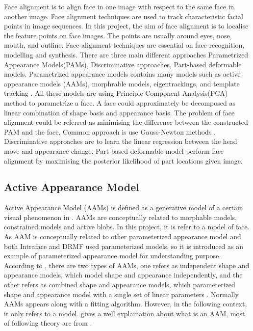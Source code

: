 Face alignment is to align face in one image with respect to the same face in another image. Face alignment techniques are used to track characteristic facial points in image sequences. In this project, the aim of face alignment is to localise the feature points on face images. The points are usually around eyes, nose, mouth, and outline. Face alignment techniques are essential on face recognition, modelling and synthesis. There are three main different approaches Parametrized Appearance Models(PAMs), Discriminative approaches, Part-based deformable models. Parametrized appearance models contains many models such as active appearance models (AAMs), morphrable models, eigentrackings, and template tracking \cite{xiong2013supervised}. All these models are using Principle Component Analysis(PCA) method to parametrize a face. A face could approximately be decomposed as linear combination of shape basis and appearance basis. The problem of face alignment could be referred as minimising the difference between the constructed PAM and the face. Common approach is use Gauss-Newton methods \cite{xiong2013supervised}. Discriminative approaches are to learn the linear regression between the head move and appearance change. Part-based deformable model perform face alignment by maximising the posterior likelihood of part locations given image\cite{xiong2013supervised}.

\subsection{Active Appearance Model}
Active Appearance Model (AAMs) is defined as a generative model of a certain visual phenomenon in \cite{matthews2004active}. AAMs are conceptually related to morphable models, constrained models and active blobs. In this project, it is refer to a model of face. As AAM is conceptually related to other parameterized appearance model and both Intraface and DRMF used parameterized models, so it is introduced as an example of parameterized appearance model for understanding purpose. According to \cite{matthews2004active}, there are two types of AAMs, one refers as independent shape and appearance models, which model shape and appearance independently, and the other refers as combined shape and appearance models, which parameterized shape and appearance model with a single set of linear parameters \cite{matthews2004active}. Normally AAMs appears along with a fitting algorithm. However, in the following context, it only refers to a model.\cite{matthews2004active} gives a well explaination about what is an AAM, most of following theory are from \cite{matthews2004active}.
